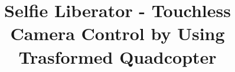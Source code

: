 \documentclass{sig-alternate-ipsn13}
\begin{document}
\title{Selfie Liberator - Touchless Camera Control by Using Trasformed Quadcopter}
%
%
%
%
%
\end{document}
